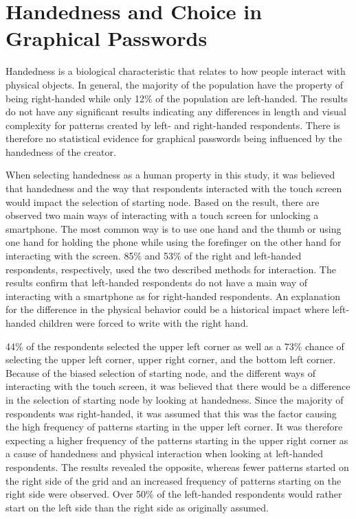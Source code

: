   \section{Handedness and Choice in Graphical Passwords}
    
    Handedness is a biological characteristic that relates to how people interact with physical objects. In general, the majority of the population have the property of being right-handed while only 12\% of the population are left-handed. The results do not have any significant results indicating any differences in length and visual complexity for patterns created by left- and right-handed respondents. There is therefore no statistical evidence for graphical passwords being influenced by the handedness of the creator.

    When selecting handedness as a human property in this study, it was believed that handedness and the way that respondents interacted with the touch screen would impact the selection of starting node. Based on the result, there are observed two main ways of interacting with a touch screen for unlocking a smartphone. The most common way is to use one hand and the thumb or using one hand for holding the phone while using the forefinger on the other hand for interacting with the screen. 85\% and 53\% of the right and left-handed respondents, respectively, used the two described methods for interaction. The results confirm that left-handed respondents do not have a main way of interacting with a smartphone as for right-handed respondents. An explanation for the difference in the physical behavior could be a historical impact where left-handed children were forced to write with the right hand.

    44\% of the respondents selected the upper left corner as well as a 73\% chance of selecting the upper left corner, upper right corner, and the bottom left corner. Because of the biased selection of starting node, and the different ways of interacting with the touch screen, it was believed that there would be a difference in the selection of starting node by looking at handedness. Since the majority of respondents was right-handed, it was assumed that this was the factor causing the high frequency of patterns starting in the upper left corner. It was therefore expecting a higher frequency of the patterns starting in the upper right corner as a cause of handedness and physical interaction when looking at left-handed respondents. The results revealed the opposite, whereas fewer patterns started on the right side of the grid and an increased frequency of patterns starting on the right side were observed. Over 50\% of the left-handed respondents would rather start on the left side than the right side as originally assumed.  


